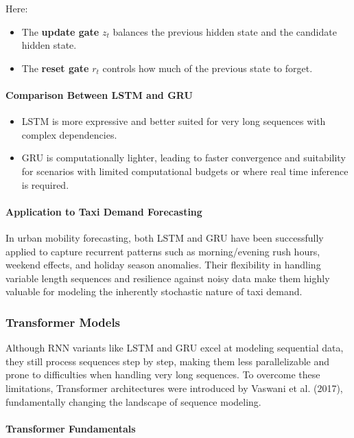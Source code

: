 \documentclass{article}
\begin{document}
Here:
\begin{itemize}
    \item The \textbf{update gate} \(z_t\) balances the previous hidden state and the candidate hidden state.
    \item The \textbf{reset gate} \(r_t\) controls how much of the previous state to forget.
\end{itemize}

\paragraph{Comparison Between LSTM and GRU}

\begin{itemize}
    \item LSTM is more expressive and better suited for very long sequences with complex dependencies\cite{ArunKumar et al., 2022}.
    \item GRU is computationally lighter, leading to faster convergence and suitability for scenarios with limited computational budgets or where real time inference is required\cite{arunkumar_2022_comparative}.
\end{itemize}

\paragraph{Application to Taxi Demand Forecasting}

In urban mobility forecasting, both LSTM and GRU have been successfully applied to capture recurrent patterns such as morning/evening rush hours, weekend effects, and holiday season anomalies. Their flexibility in handling variable length sequences and resilience against noisy data make them highly valuable for modeling the inherently stochastic nature of taxi demand.

\subsubsection{Transformer Models}

Although RNN variants like LSTM and GRU excel at modeling sequential data, they still process sequences step by step, making them less parallelizable and prone to difficulties when handling very long sequences. To overcome these limitations, Transformer architectures were introduced by Vaswani et al. (2017)\cite{vaswani_2017_attention}, fundamentally changing the landscape of sequence modeling.

\paragraph{Transformer Fundamentals}
\end{document}
